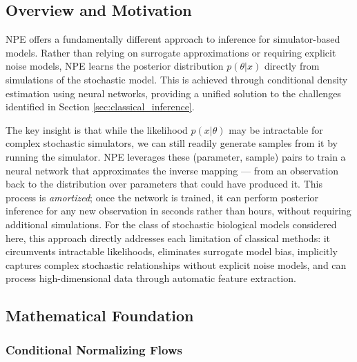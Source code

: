 \documentclass{article}
\begin{document}
\subsection{Overview and Motivation}
NPE \citep{papamakarios2016fast, greenberg2019automatic,Cranmer2020FrontierSBI} offers a fundamentally different approach to inference for simulator-based models. Rather than relying on surrogate approximations or requiring explicit noise models, NPE learns the posterior distribution $p(\theta | x)$ directly from simulations of the stochastic model. This is achieved through conditional density estimation using neural networks, providing a unified solution to the challenges identified in Section \ref{sec:classical_inference}.

The key insight is that while the likelihood $p(x|\theta)$ may be intractable for complex stochastic simulators, we can still readily generate samples from it by running the simulator. NPE leverages these (parameter, sample) pairs to train a neural network that approximates the inverse mapping — from an observation back to the distribution over parameters that could have produced it. This process is \textit{amortized}; once the network is trained, it can perform posterior inference for any new observation in seconds rather than hours, without requiring additional simulations. For the class of stochastic biological models considered here, this approach directly addresses each limitation of classical methods: it circumvents intractable likelihoods, eliminates surrogate model bias, implicitly captures complex stochastic relationships without explicit noise models, and can process high-dimensional data through automatic feature extraction.

\subsection{Mathematical Foundation}

\subsubsection{Conditional Normalizing Flows}
\end{document}

